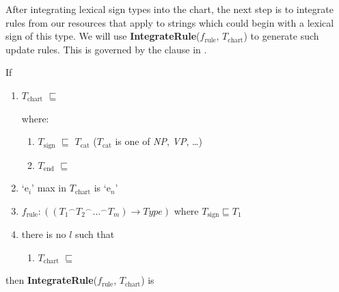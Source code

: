 After integrating lexical sign types into the chart, the next step is to
integrate rules from our resources that apply to strings which could
begin with a lexical sign of this type.  We will use
\textbf{IntegrateRule}($f_{\mathrm{rule}}$, $T_{\mathrm{chart}}$) to
generate such update rules.  This is governed by the clause in
\nexteg{}.
\begin{ex} 
If
\begin{enumerate}
\item $T_{\mathrm{chart}}$ $\sqsubseteq$ 

where: 
\begin{enumerate}

\item [] $T_{\mathrm{sign}}$ $\sqsubseteq$ $T_{\mathrm{cat}}$
($T_{\mathrm{cat}}$ is one of \textit{NP}, \textit{VP}, \ldots)

\item [] $T_{\mathrm{end}}$ $\sqsubseteq$ 
\end{enumerate}


\item `e$_i$' max in $T_{\mathrm{chart}}$ is `e$_n$'

\item $f_{\mathrm{rule}} :
  (({T_1}^{\frown}{T_2}^{\frown}\ldots^{\frown}T_m)\rightarrow\textit{Type})$
  where $T_{\mathrm{sign}}\sqsubseteq T_1$

\item there is no $l$ such that 
\begin{enumerate}
\item []$T_{\mathrm{chart}}$ $\sqsubseteq$ 
\end{enumerate}
\end{enumerate}

then \textbf{IntegrateRule}($f_{\mathrm{rule}}$, $T_{\mathrm{chart}}$)
is


\end{ex}
